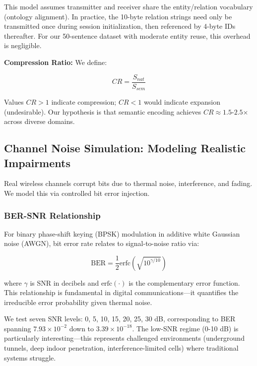 \documentclass[conference]{IEEEtran}
\begin{document}
This model assumes transmitter and receiver share the entity/relation 
vocabulary (ontology alignment). In practice, the 10-byte relation strings 
need only be transmitted once during session initialization, then referenced 
by 4-byte IDs thereafter. For our 50-sentence dataset with moderate 
entity reuse, this overhead is negligible.

\textbf{Compression Ratio:} We define:

\begin{equation}
CR = \frac{S_{nat}}{S_{sem}}
\label{eq:compression}
\end{equation}

Values $CR > 1$ indicate compression; $CR < 1$ would indicate expansion 
(undesirable). Our hypothesis is that semantic encoding achieves $CR \approx 1.5$-$2.5$× 
across diverse domains.

\subsection{Channel Noise Simulation: Modeling Realistic Impairments}

Real wireless channels corrupt bits due to thermal noise, interference, 
and fading. We model this via controlled bit error injection.

\subsubsection{BER-SNR Relationship}

For binary phase-shift keying (BPSK) modulation in additive white Gaussian 
noise (AWGN), bit error rate relates to signal-to-noise ratio via:

\begin{equation}
\text{BER} = \frac{1}{2} \text{erfc}\left(\sqrt{10^{\gamma/10}}\right)
\label{eq:ber}
\end{equation}

where $\gamma$ is SNR in decibels and $\text{erfc}(\cdot)$ is the complementary 
error function. This relationship is fundamental in digital communications—it 
quantifies the irreducible error probability given thermal noise.

We test seven SNR levels: 0, 5, 10, 15, 20, 25, 30 dB, corresponding 
to BER spanning $7.93 \times 10^{-2}$ down to $3.39 \times 10^{-18}$. 
The low-SNR regime (0-10 dB) is particularly interesting—this represents 
challenged environments (underground tunnels, deep indoor penetration, 
interference-limited cells) where traditional systems struggle.
\end{document}
